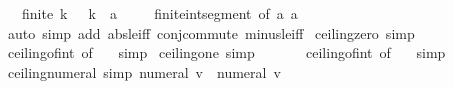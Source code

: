 \begin{isabellebody}
\ \ \ {\isachardoublequoteopen}finite\ {\isacharbraceleft}{\kern0pt}k\ {\isasymin}\ {\isasymint}{\isachardot}{\kern0pt}\ {\isasymbar}k{\isasymbar}\ {\isasymle}\ a{\isacharbraceright}{\kern0pt}{\isachardoublequoteclose}\ \isanewline
%
\isadelimproof
\ \ %
\endisadelimproof
%
\isatagproof
{}\isamarkupfalse%
\ finite{\isacharunderscore}{\kern0pt}int{\isacharunderscore}{\kern0pt}segment\ {\isacharbrackleft}{\kern0pt}of\ {\isachardoublequoteopen}{\isacharminus}{\kern0pt}a{\isachardoublequoteclose}\ a{\isacharbrackright}{\kern0pt}\ \isamarkupfalse%
\ {\isacharparenleft}{\kern0pt}auto\ simp\ add{\isacharcolon}{\kern0pt}\ abs{\isacharunderscore}{\kern0pt}le{\isacharunderscore}{\kern0pt}iff\ conj{\isacharunderscore}{\kern0pt}commute\ minus{\isacharunderscore}{\kern0pt}le{\isacharunderscore}{\kern0pt}iff{\isacharparenright}{\kern0pt}%
\endisatagproof
{\isafoldproof}%
%
\isadelimproof
%
\endisadelimproof
%
\isadelimdocument
%
\endisadelimdocument
%
\isatagdocument
%
\isamarkuptrue%
%
\endisatagdocument
{\isafolddocument}%
%
\isadelimdocument
%
\endisadelimdocument
{}\isamarkupfalse%
\ ceiling{\isacharunderscore}{\kern0pt}zero\ {\isacharbrackleft}{\kern0pt}simp{\isacharbrackright}{\kern0pt}{\isacharcolon}{\kern0pt}\ {\isachardoublequoteopen}{\isasymlceil}{}{\isasymrceil}\ {\isacharequal}{\kern0pt}\ {}{\isachardoublequoteclose}\isanewline
%
\isadelimproof
\ \ %
\endisadelimproof
%
\isatagproof
{}\isamarkupfalse%
\ ceiling{\isacharunderscore}{\kern0pt}of{\isacharunderscore}{\kern0pt}int\ {\isacharbrackleft}{\kern0pt}of\ {}{\isacharbrackright}{\kern0pt}\ \isamarkupfalse%
\ simp%
\endisatagproof
{\isafoldproof}%
%
\isadelimproof
\isanewline
%
\endisadelimproof
\isanewline
{}\isamarkupfalse%
\ ceiling{\isacharunderscore}{\kern0pt}one\ {\isacharbrackleft}{\kern0pt}simp{\isacharbrackright}{\kern0pt}{\isacharcolon}{\kern0pt}\ {\isachardoublequoteopen}{\isasymlceil}{}{\isasymrceil}\ {\isacharequal}{\kern0pt}\ {}{\isachardoublequoteclose}\isanewline
%
\isadelimproof
\ \ %
\endisadelimproof
%
\isatagproof
{}\isamarkupfalse%
\ ceiling{\isacharunderscore}{\kern0pt}of{\isacharunderscore}{\kern0pt}int\ {\isacharbrackleft}{\kern0pt}of\ {}{\isacharbrackright}{\kern0pt}\ \isamarkupfalse%
\ simp%
\endisatagproof
{\isafoldproof}%
%
\isadelimproof
\isanewline
%
\endisadelimproof
\isanewline
{}\isamarkupfalse%
\ ceiling{\isacharunderscore}{\kern0pt}numeral\ {\isacharbrackleft}{\kern0pt}simp{\isacharbrackright}{\kern0pt}{\isacharcolon}{\kern0pt}\ {\isachardoublequoteopen}{\isasymlceil}numeral\ v{\isasymrceil}\ {\isacharequal}{\kern0pt}\ numeral\ v{\isachardoublequoteclose}\isanewline

\end{isabellebody}
